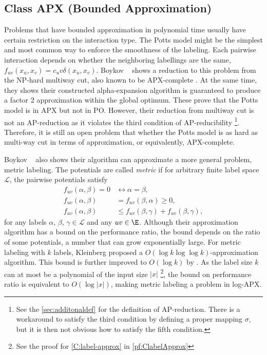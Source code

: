 \subsection{Class APX (Bounded Approximation)}

Problems that have bounded approximation in polynomial time usually have certain restriction on the interaction type. The Potts model might be the simplest and most common way to enforce the smoothness of the labeling. Each pairwise interaction depends on whether the neighboring labellings are the same, \ie $f_{uv}(x_u,x_v) = c_uv\delta(x_u, x_v)$.  Boykov \etal~\cite{boykov2001approximate} shows a reduction to this problem from the NP-hard multiway cut, also known to be APX-complete \cite{ausiello1999complexity, dahlhaus1994complexity}. At the same time, they shows their constructed alpha-expansion algorithm is guaranteed to produce a factor 2 approximation within the global optimum. These prove that the Potts model is in APX but not in PO. However, their reduction from multiway cut is not an AP-reduction as it violates the third condition of AP-reducibility \footnote{See the \cref{sec:additonaldef} for the definition of AP-reduction. There is a workaround to satisfy the third condition by defining a proper mapping $\sigma$, but it is then not obvious how to satisfy the fifth condition.}. Therefore, it is still an open problem that whether the Potts model is as hard as multi-way cut in terms of approximation, or equivalently, APX-complete.

Boykov \etal~\cite{boykov2001approximate} also shows their algorithm can approximate a more general problem, \ie metric labeling. The potentials are called {\em metric} if for arbitrary finite label space $\mathcal{L}$, the pairwise potentials satisfy
\begin{align}
    f_{uv}(\alpha, \beta) = 0 & \leftrightarrow \alpha = \beta, \\
        f_{uv}(\alpha, \beta) & = f_{uv}(\beta, \alpha) \geq 0, \\
        f_{uv}(\alpha, \beta) & \leq f_{uv}(\beta, \gamma) + f_{uv}(\beta, \gamma),
\end{align}
for any labels $\alpha$, $\beta$, $\gamma \in \mathcal{L}$ and any $uv \in \E$. Although their approximation algorithm has a bound on the performance ratio, the bound depends on the ratio of some potentials, a number that can grow exponentially large. For metric labeling with $k$ labels, Kleinberg \etal proposed a $O(\log k \log \log k)$-approximation algorithm. This bound is further improved to $O(\log k)$ by \citet{Chekuri:2005:LPF}. As the label size $k$ can at most be a polynomial of the input size $|x|$ \footnote{See the proof for \cref{C:label-approx} in \cref{pf:ClabelApprox}}, the bound on performance ratio is equivalent to $O(\log |x|)$, making metric labeling a problem in log-APX.


